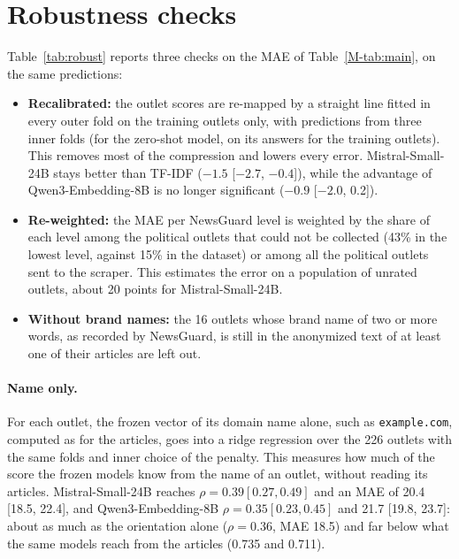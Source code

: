 \documentclass[11pt,a4paper]{article}
\begin{document}
\section{Robustness checks}\label{app:robust}
Table~\ref{tab:robust} reports three checks on the MAE of Table~\ref{M-tab:main}, on the same predictions:
\begin{itemize}
  \item \textbf{Recalibrated:} the outlet scores are re-mapped by a straight line fitted in every outer fold on the
        training outlets only, with predictions from three inner folds (for the zero-shot model, on its answers for the
        training outlets). This removes most of the compression and lowers every error. Mistral-Small-24B stays better
        than TF-IDF ($-1.5$ [$-2.7$, $-0.4$]), while the advantage of Qwen3-Embedding-8B is no longer significant
        ($-0.9$ [$-2.0$, 0.2]).
  \item \textbf{Re-weighted:} the MAE per NewsGuard level is weighted by the share of each level among the political
        outlets that could not be collected (43\% in the lowest level, against 15\% in the dataset) or among all the
        political outlets sent to the scraper. This estimates the error on a population of unrated outlets, about 20
        points for Mistral-Small-24B.
  \item \textbf{Without brand names:} the 16 outlets whose brand name of two or more words, as recorded by NewsGuard, is
        still in the anonymized text of at least one of their articles are left out.
\end{itemize}

\paragraph{Name only.} For each outlet, the frozen vector of its domain name alone, such as \texttt{example.com},
computed as for the articles, goes into a ridge regression over the 226 outlets with the same folds and inner choice of
the penalty. This measures how much of the score the frozen models know from the name of an outlet, without reading its
articles. Mistral-Small-24B reaches $\rho = 0.39 [0.27, 0.49]$ and an MAE of 20.4 [18.5, 22.4], and Qwen3-Embedding-8B
$\rho = 0.35 [0.23, 0.45]$ and 21.7 [19.8, 23.7]: about as much as the orientation alone ($\rho = 0.36$, MAE 18.5) and
far below what the same models reach from the articles (0.735 and 0.711).
\end{document}
